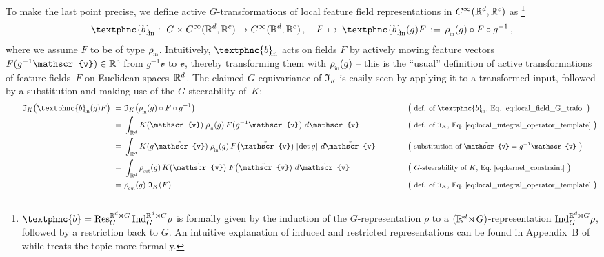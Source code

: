 To make the last point precise, we define active $G$-transformations of local feature field representations in $C^\infty(\mathbb{R}^d,\mathbb{R}^c)$ as%
\footnote{
    ${\textphnc{b} = \Res_G^{\R^d\mkern-1mu\rtimes G}\Ind_G^{\R^d\mkern-1mu\rtimes G}\!\rho}$ is formally given by the induction of the $G$-representation $\rho$ to a ${(\mathbb{R}^d\mkern-4mu\rtimes\mkern-2muG)}$-representation ${\operatorname{Ind}_G^{\mathbb{R}^d\mkern-1mu\rtimes G}\!\rho}$, followed by a restriction back to $G$.
    An intuitive explanation of induced and restricted representations can be found in Appendix~B of~\cite{Weiler2019_E2CNN} while \cite{gallier2019harmonicRepr} treats the topic more formally.
}
\begin{align}\label{eq:local_field_G_trafo}
    \textphnc{b}_{\mkern-5mu\textup{in}}:\ 
    G \times C^\infty(\R^d,\R^c) \to C^\infty(\R^d,\R^c) \,, \quad
    F \,\mapsto\, \textphnc{b}_{\mkern-5mu\textup{in}}(g)F \,:=\, \rhoin(g) \circ F \circ g^{-1} \,,
\end{align}
where we assume $F$ to be of type $\rhoin$.
Intuitively, $\textphnc{b}_{\mkern-5mu\textup{in}}$ acts on fields $F$ by actively moving feature vectors $F(g^{-1}\mathscr{v}) \in \R^c$ from $g^{-1}\mathscr{v}$ to $\mathscr{v}$, thereby transforming them with $\rhoin(g)$
-- this is the ``usual'' definition of active transformations of feature fields~$F$ on Euclidean spaces~$\mathbb{R}^d$.
The claimed $G$-equivariance of $\mathfrak{I}_K$ is easily seen by applying it to a transformed input, followed by a substitution and making use of the $G$-steerability of~$K$:
\begin{alignat}{3}\label{eq:active_local_gauge_trafo}
\qquad
    \mathfrak{I}_K \big( \textphnc{b}_{\mkern-5mu\textup{in}}(g) F \big)
    \ =&\ \mathfrak{I}_K \big( \rhoin(g) \circ F \circ g^{-1} \big)
        \qquad\quad && \big( \text{\small def. of $\textphnc{b}_{\mkern-5mu\textup{in}}$, Eq.~\eqref{eq:local_field_G_trafo} } \big) \notag\\
    \ =&\ \int_{\R^d} K(\mathscr{v})\; \rhoin(g)\, F\big(g^{-1}\mathscr{v})\ d\mathscr{v}
        \qquad\quad && \big( \text{\small def. of $\mathfrak{I}_K$, Eq.~\eqref{eq:local_integral_operator_template} } \big) \notag\\
    \ =&\ \int_{\R^d} K(g\mkern1mu\tilde{\mathscr{v}})\; \rhoin(g)\, F\big(\tilde{\mathscr{v}})\; \detg \ d\tilde{\mathscr{v}}
        \qquad\quad && \big( \text{\small substitution of $\tilde{\mathscr{v}} = g^{-1} \mathscr{v}$ } \big) \notag\\
    \ =&\ \int_{\R^d} \rhoout(g)\, K(\tilde{\mathscr{v}})\; F\big(\tilde{\mathscr{v}})\ d\tilde{\mathscr{v}}
        \qquad\quad && \big( \text{\small $G$-steerability of $K$, Eq.~\eqref{eq:kernel_constraint} } \big) \notag\\
    \ =&\ \rhoout(g)\; \mathfrak{I}_K(F)
        \qquad\quad && \big( \text{\small def. of $\mathfrak{I}_K$, Eq.~\eqref{eq:local_integral_operator_template} } \big)
\end{alignat}
